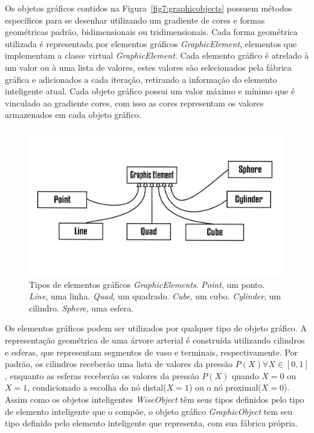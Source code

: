 \documentclass[a4paper,12pt]{monografia}
\theoremstyle{plain}
\theoremstyle{definition}
\theoremstyle{remark}
\begin{document}
Os objetos gráficos contidos na Figura~\ref{fig7:graphicobjects} possuem métodos específicos para se desenhar utilizando um gradiente de cores e formas geométricas padrão, bidimensionais ou tridimensionais. Cada forma geométrica utilizada é representada por elementos gráficos \textit{GraphicElement}, elementos que implementam a classe virtual \textit{GraphicElement}. Cada elemento gráfico é atrelado à um valor ou à uma lista de valores, estes valores são selecionados pela fábrica gráfica e adicionados a cada iteração, retirando a informação do elemento inteligente atual. Cada objeto gráfico possui um valor máximo e mínimo que é vinculado ao gradiente cores, com isso as cores representam os valores armazenados em cada objeto gráfico.

\begin{figure}[!htbp]
	\centering
	\includegraphics[scale=1]{Figures/GraphicElements}
	\caption{Tipos de elementos gráficos \textit{GraphicElements}. \textit{Point}, um ponto. \textit{Line}, uma linha. \textit{Quad}, um quadrado. \textit{Cube}, um cubo. \textit{Cylinder}, um cilindro. \textit{Sphere}, uma esfera.}
	\label{fig7:graphicelements}
\end{figure}

Os elementos gráficos podem ser utilizados por qualquer tipo de objeto gráfico. A representação geométrica de uma árvore arterial é construída utilizando cilindros e esferas, que representam segmentos de vaso e terminais, respectivamente. Por padrão, os cilindros receberão uma lista de valores da pressão $P(X) \forall X \in [0,1]$, enquanto as esferas receberão os valores da pressão $P(X)$ quando $X=0$ ou $X=1$, condicionado a escolha do nó distal($X=1$) ou o nó proximal($X=0$).  Assim como os objetos inteligentes \textit{WiseObject} têm seus tipos definidos pelo tipo de elemento inteligente que o compõe, o objeto gráfico \textit{GraphicObject} tem seu tipo definido pelo elemento inteligente que representa, com sua fábrica própria.
\end{document}

